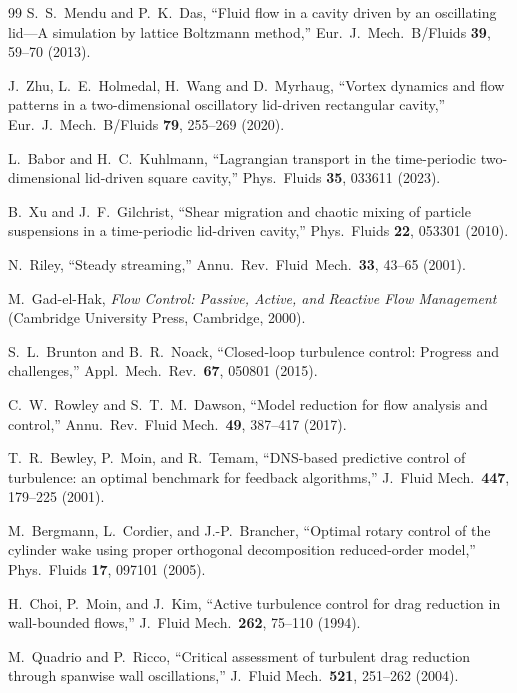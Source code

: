 \documentclass[11pt,a4paper]{article}
\newenvironment{chgadd}{\par\color{blue}}{\par\color{black}}
\begin{document}
\begin{chgadd}
\begin{thebibliography}{99}
S.~S.~Mendu and P.~K.~Das,
``Fluid flow in a cavity driven by an oscillating lid---A simulation by lattice
Boltzmann method,''
Eur.\ J.\ Mech.\ B/Fluids \textbf{39}, 59--70 (2013).

J.~Zhu, L.~E.~Holmedal, H.~Wang and D.~Myrhaug,
``Vortex dynamics and flow patterns in a two-dimensional oscillatory lid-driven
rectangular cavity,''
Eur.\ J.\ Mech.\ B/Fluids \textbf{79}, 255--269 (2020).

L.~Babor and H.~C.~Kuhlmann,
``Lagrangian transport in the time-periodic two-dimensional lid-driven square
cavity,''
Phys.\ Fluids \textbf{35}, 033611 (2023).

B.~Xu and J.~F.~Gilchrist,
``Shear migration and chaotic mixing of particle suspensions in a time-periodic
lid-driven cavity,''
Phys.\ Fluids \textbf{22}, 053301 (2010).

N.~Riley,
``Steady streaming,''
Annu.\ Rev.\ Fluid\ Mech.\ \textbf{33}, 43--65 (2001).

M.~Gad-el-Hak,
\textit{Flow Control: Passive, Active, and Reactive Flow Management}
(Cambridge University Press, Cambridge, 2000).

S.~L.~Brunton and B.~R.~Noack,
``Closed-loop turbulence control: Progress and challenges,''
Appl.\ Mech.\ Rev.\ \textbf{67}, 050801 (2015).

C.~W.~Rowley and S.~T.~M.~Dawson,
``Model reduction for flow analysis and control,''
Annu.\ Rev.\ Fluid Mech.\ \textbf{49}, 387--417 (2017).

T.~R.~Bewley, P.~Moin, and R.~Temam,
``DNS-based predictive control of turbulence: an optimal benchmark for feedback
algorithms,'' J.\ Fluid Mech.\ \textbf{447}, 179--225 (2001).

M.~Bergmann, L.~Cordier, and J.-P.~Brancher,
``Optimal rotary control of the cylinder wake using proper orthogonal
decomposition reduced-order model,'' Phys.\ Fluids \textbf{17}, 097101 (2005).

H.~Choi, P.~Moin, and J.~Kim,
``Active turbulence control for drag reduction in wall-bounded flows,''
J.\ Fluid Mech.\ \textbf{262}, 75--110 (1994).

M.~Quadrio and P.~Ricco,
``Critical assessment of turbulent drag reduction through spanwise wall
oscillations,'' J.\ Fluid Mech.\ \textbf{521}, 251--262 (2004).


\end{thebibliography}
\end{chgadd}
\end{document}
